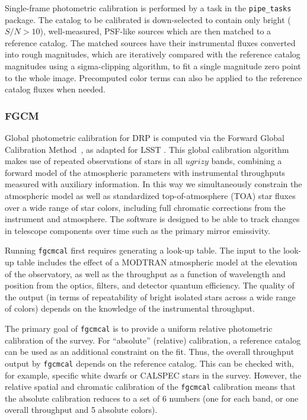 Single-frame photometric calibration is performed by a task in the \texttt{pipe\_tasks} package.
The catalog to be calibrated is down-selected to contain only bright ($S/N>10$), well-measured, PSF-like sources which are then matched to a reference catalog.
The matched sources have their instrumental fluxes converted into rough magnitudes, which are iteratively compared with the reference catalog magnitudes using a sigma-clipping algorithm, to fit a single magnitude zero point to the whole image.
Precomputed color terms can also be applied to the reference catalog fluxes when needed.

\subsubsection{FGCM}
\label{sec:fgcmcal}

Global photometric calibration for DRP is computed via the Forward Global Calibration Method~\citep[FGCM;][]{2018AJ....155...41B}, as adapted for LSST \citep{SITCOMTN-086}.
This global calibration algorithm makes use of repeated observations of stars in all $ugrizy$ bands, combining a forward model of the atmospheric parameters with instrumental throughputs measured with auxiliary information.
In this way we simultaneously constrain the atmospheric model as well as standardized top-of-atmosphere (TOA) star fluxes over a wide range of star colors, including full chromatic corrections from the instrument and atmosphere.
The software is designed to be able to track changes in telescope components over time such as the primary mirror emissivity.

Running \texttt{fgcmcal} first requires generating a look-up table.
The input to the look-up table includes the effect of a MODTRAN \citep{1999SPIE.3756..348B} atmospheric model at the elevation of the observatory, as well as the throughput as a function of wavelength and position from the optics, filters, and detector quantum efficiency.
The quality of the output (in terms of repeatability of bright isolated stars across a wide range of colors) depends on the knowledge of the instrumental throughput.

The primary goal of \texttt{fgcmcal} is to provide a uniform relative photometric calibration of the survey.
For ``absolute'' (relative) calibration, a reference catalog can be used as an additional constraint on the fit.
Thus, the overall throughput output by \texttt{fgcmcal} depends on the reference catalog.
This can be checked with, for example, specific white dwarfs or CALSPEC \citep{2007ASPC..364..315B} stars in the survey.
However, the relative spatial and chromatic calibration of the \texttt{fgcmcal} calibration means that the absolute calibration reduces to a set of 6 numbers (one for each band, or one overall throughput and 5 absolute colors).

